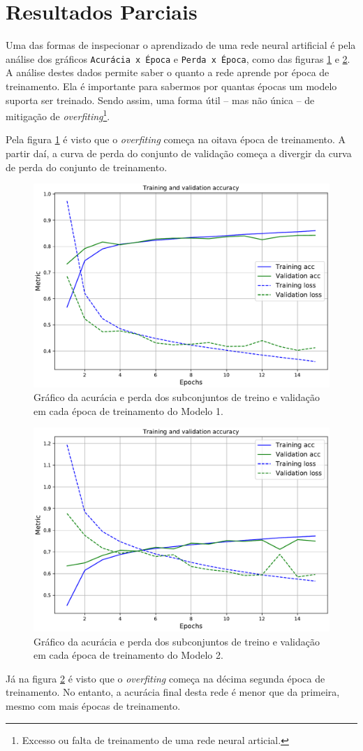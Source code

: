 \section*{Resultados Parciais}
Uma das formas de inspecionar o aprendizado de uma rede neural artificial é pela análise dos gráficos \texttt{Acurácia x Época} e \texttt{Perda x Época}, como das figuras \ref{fig:conv_train} e \ref{fig:pretrained_train}. A análise destes dados permite saber o quanto a rede aprende por época de treinamento. Ela é importante para sabermos por quantas épocas um modelo suporta ser treinado. Sendo assim, uma forma útil -- mas não única -- de mitigação de \emph{overfiting}\footnote{Excesso ou falta de treinamento de uma rede neural articial.}.

Pela figura \ref{fig:conv_train} é visto que o \emph{overfiting} começa na oitava época de treinamento. A partir daí, a curva de perda do conjunto de validação começa a divergir da curva de perda do conjunto de treinamento.

\pagebreak
\begin{figure}[h!]
  \centering
  \includegraphics[width=.79\textwidth]{figures/conv_train.pdf}
  \caption{Gráfico da acurácia e perda dos subconjuntos de treino e validação em cada época de treinamento do Modelo 1.}
  \label{fig:conv_train}
\end{figure}

\begin{figure}[h!]
  \centering
  \includegraphics[width=.79\textwidth]{figures/pretrained_train.pdf}
  \caption{Gráfico da acurácia e perda dos subconjuntos de treino e validação em cada época de treinamento do Modelo 2.}
  \label{fig:pretrained_train}
\end{figure}
\pagebreak

Já na figura \ref{fig:pretrained_train} é visto que o \emph{overfiting} começa na décima segunda época de treinamento. No entanto, a acurácia final desta rede é menor que da primeira, mesmo com mais épocas de treinamento.